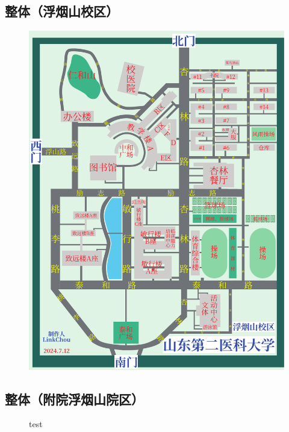 \subsection[整体（浮烟山校区）]{整体（浮烟山校区）}
\begin{figure}[H]
    \centering
    \includegraphics*[height=0.9\textheight]{resources/map/浮烟山校区简图.pdf}
    \label{map_fuyanshan_holistic}
\end{figure}

\newpage
\subsection[整体（附院浮烟山院区）]{整体（附院浮烟山院区）}
\begin{figure}[H]
    \centering
    test
    \label{map_affiliated_hospital_fuyanshan}
\end{figure}

\newpage